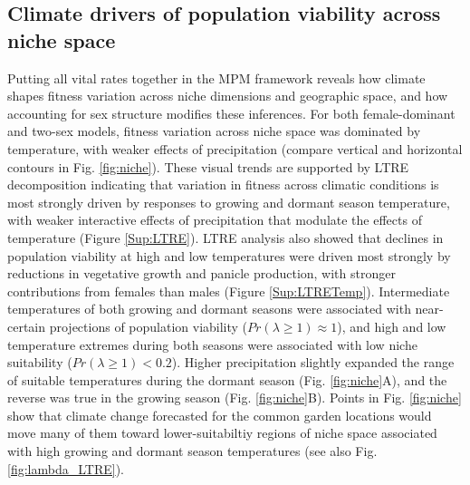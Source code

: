 \documentclass[12pt]{article}\usepackage[]{graphicx}\usepackage[dvipsnames]{xcolor}
\begin{document}
\subsection*{Climate drivers of population viability across niche space}
Putting all vital rates together in the MPM framework reveals how climate shapes fitness variation across niche dimensions and geographic space, and how accounting for sex structure modifies these inferences. 
For both female-dominant and two-sex models, fitness variation across niche space was dominated by temperature, with weaker effects of precipitation (compare vertical and horizontal contours in Fig. \ref{fig:niche}). 
These visual trends are supported by LTRE decomposition indicating that variation in fitness across climatic conditions is most strongly driven by responses to growing and dormant season temperature, with weaker interactive effects of precipitation that modulate the effects of temperature (Figure \ref{Sup:LTRE}). 
LTRE analysis also showed that declines in population viability at high and low temperatures were driven most strongly by reductions in vegetative growth and panicle production, with stronger contributions from females than males (Figure \ref{Sup:LTRETemp}). 
Intermediate temperatures of both growing and dormant seasons were associated with near-certain projections of population viability ($Pr(\lambda \ge 1) \approx 1$), and high and low temperature extremes during both seasons were associated with low niche suitability ($Pr(\lambda \ge 1) < 0.2$). 
Higher precipitation slightly expanded the range of suitable temperatures during the dormant season (Fig. \ref{fig:niche}A), and the reverse was true in the growing season (Fig. \ref{fig:niche}B). 
Points in Fig. \ref{fig:niche} show that climate change forecasted for the common garden locations would move many of them toward lower-suitabiltiy regions of niche space associated with high growing and dormant season temperatures (see also Fig. \ref{fig:lambda_LTRE}).
\end{document}
